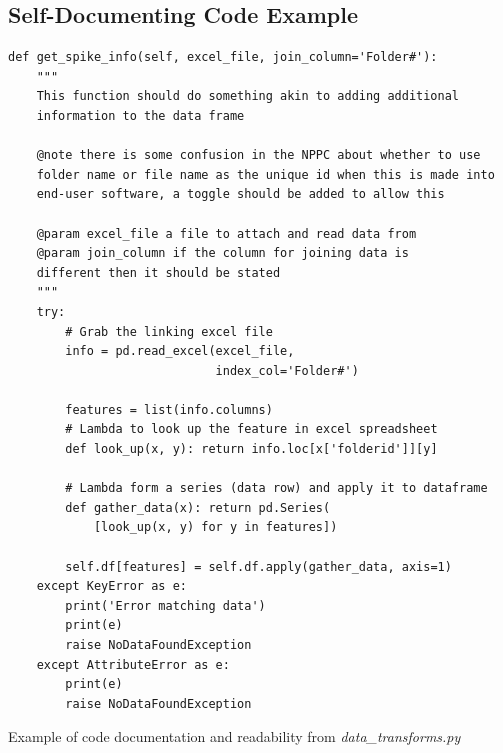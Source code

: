 \documentclass[11pt]{report}
\begin{document}
\clearpage
\subsection{Self-Documenting Code Example}
\label{sec-7-3-3}
\begin{listing}[H]
\begin{verbatim}
def get_spike_info(self, excel_file, join_column='Folder#'):
    """
    This function should do something akin to adding additional
    information to the data frame

    @note there is some confusion in the NPPC about whether to use
    folder name or file name as the unique id when this is made into
    end-user software, a toggle should be added to allow this

    @param excel_file a file to attach and read data from
    @param join_column if the column for joining data is
    different then it should be stated
    """
    try:
        # Grab the linking excel file
        info = pd.read_excel(excel_file,
                             index_col='Folder#')

        features = list(info.columns)
        # Lambda to look up the feature in excel spreadsheet
        def look_up(x, y): return info.loc[x['folderid']][y]

        # Lambda form a series (data row) and apply it to dataframe
        def gather_data(x): return pd.Series(
            [look_up(x, y) for y in features])

        self.df[features] = self.df.apply(gather_data, axis=1)
    except KeyError as e:
        print('Error matching data')
        print(e)
        raise NoDataFoundException
    except AttributeError as e:
        print(e)
        raise NoDataFoundException
\end{verbatim}
\caption{\label{lst:docexample}Example of code documentation and readability from \emph{data\_transforms.py}}
\end{listing}

\clearpage


\end{document}
